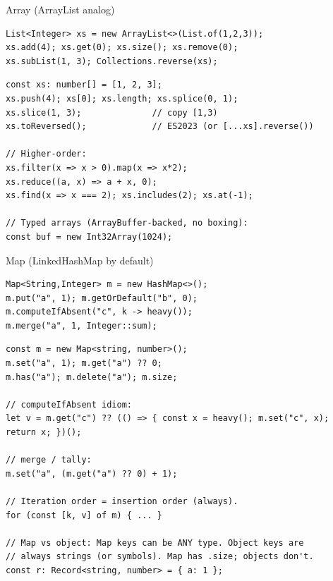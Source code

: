 \documentclass[10pt]{article}
\begin{document}
\bigskip


\begin{construct}{Array (ArrayList analog)}
\noindent
\begin{minipage}[t]{0.485\linewidth}
\begin{lstlisting}[style=java, title=Java]
List<Integer> xs = new ArrayList<>(List.of(1,2,3));
xs.add(4); xs.get(0); xs.size(); xs.remove(0);
xs.subList(1, 3); Collections.reverse(xs);
\end{lstlisting}
\end{minipage}\hfill
\begin{minipage}[t]{0.485\linewidth}
\begin{lstlisting}[style=ts, title=TypeScript]
const xs: number[] = [1, 2, 3];
xs.push(4); xs[0]; xs.length; xs.splice(0, 1);
xs.slice(1, 3);              // copy [1,3)
xs.toReversed();             // ES2023 (or [...xs].reverse())

// Higher-order:
xs.filter(x => x > 0).map(x => x*2);
xs.reduce((a, x) => a + x, 0);
xs.find(x => x === 2); xs.includes(2); xs.at(-1);

// Typed arrays (ArrayBuffer-backed, no boxing):
const buf = new Int32Array(1024);
\end{lstlisting}
\end{minipage}
\end{construct}

\begin{construct}{Map (LinkedHashMap by default)}
\noindent
\begin{minipage}[t]{0.485\linewidth}
\begin{lstlisting}[style=java, title=Java]
Map<String,Integer> m = new HashMap<>();
m.put("a", 1); m.getOrDefault("b", 0);
m.computeIfAbsent("c", k -> heavy());
m.merge("a", 1, Integer::sum);
\end{lstlisting}
\end{minipage}\hfill
\begin{minipage}[t]{0.485\linewidth}
\begin{lstlisting}[style=ts, title=TypeScript]
const m = new Map<string, number>();
m.set("a", 1); m.get("a") ?? 0;
m.has("a"); m.delete("a"); m.size;

// computeIfAbsent idiom:
let v = m.get("c") ?? (() => { const x = heavy(); m.set("c", x); return x; })();

// merge / tally:
m.set("a", (m.get("a") ?? 0) + 1);

// Iteration order = insertion order (always).
for (const [k, v] of m) { ... }

// Map vs object: Map keys can be ANY type. Object keys are
// always strings (or symbols). Map has .size; objects don't.
const r: Record<string, number> = { a: 1 };
\end{lstlisting}
\end{minipage}
\end{construct}
\end{document}
